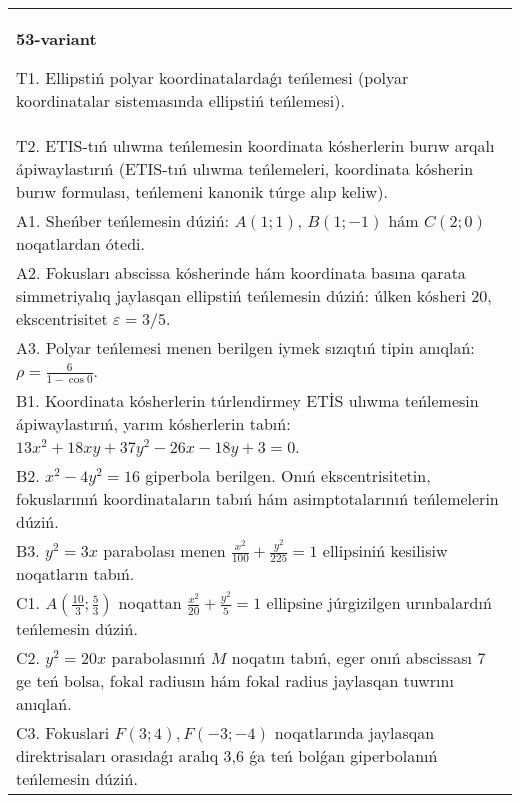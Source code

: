 \documentclass{article}
\begin{document}
\begin{tabular}{m{17cm}}
\textbf{53-variant}
\newline

T1. Ellipstiń polyar koordinatalardaǵı teńlemesi (polyar koordinatalar sistemasında ellipstiń teńlemesi).\\

T2. ETIS-tıń ulıwma teńlemesin koordinata kósherlerin burıw arqalı ápiwaylastırıń (ETIS-tıń ulıwma teńlemeleri, koordinata kósherin burıw formulası, teńlemeni kanonik túrge alıp keliw).\\

A1. Sheńber teńlemesin dúziń: $A (1;1) $, $B (1;-1) $ hám $C (2;0) $ noqatlardan ótedi.\\

A2. Fokusları abscissa kósherinde hám koordinata basına qarata simmetriyalıq jaylasqan ellipstiń teńlemesin dúziń: úlken kósheri $20$, ekscentrisitet $\varepsilon=3/5$.\\

A3. Polyar teńlemesi menen berilgen iymek sızıqtıń tipin anıqlań: $\rho=\frac{6}{1-\cos 0}$.\\

B1. Koordinata kósherlerin túrlendirmey ETİS ulıwma teńlemesin ápiwaylastırıń, yarım kósherlerin tabıń: $13x^{2} + 18xy + 37y^{2} - 26x - 18y + 3 = 0$.  \\

B2. $x^{2} - 4y^{2} = 16$ giperbola berilgen. Onıń ekscentrisitetin, fokuslarınıń koordinataların tabıń hám asimptotalarınıń teńlemelerin dúziń.\\

B3. $y^{2} = 3x$ parabolası menen $\frac{x^{2}}{100} + \frac{y^{2}}{225} = 1$ ellipsiniń kesilisiw noqatların tabıń.  \\

C1. $A(\frac{10}{3};\frac{5}{3})$ noqattan $\frac{x^{2}}{20} + \frac{y^{2}}{5} = 1$ ellipsine júrgizilgen urınbalardıń teńlemesin dúziń.  \\

C2. $y^{2} = 20x$ parabolasınıń $M$ noqatın tabıń, eger onıń abscissası 7 ge teń bolsa, fokal radiusın hám fokal radius jaylasqan tuwrını anıqlań.\\

C3. Fokuslari $F(3;4), F(-3;-4)$ noqatlarında jaylasqan direktrisaları orasıdaǵı aralıq 3,6 ǵa teń bolǵan giperbolanıń teńlemesin dúziń.  \\

\end{tabular}
\vspace{1cm}
\end{document}
